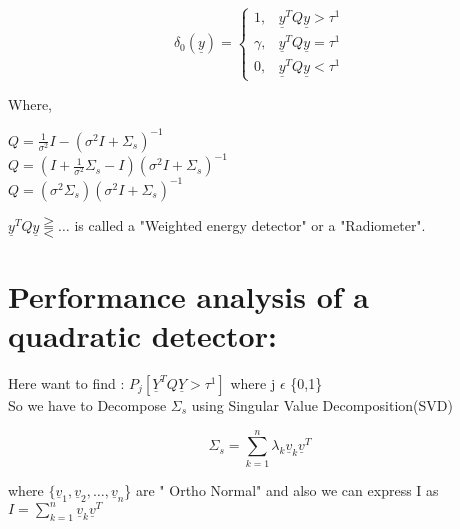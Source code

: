 \documentclass[12pt]{report}
\begin{document}
	\begin{equation}
	\delta_0 (\underline{y}) =  
	\begin{cases}
	1, &\underline{y}^TQ\underline{y}>\tau^1   \\
	\gamma,&\underline{y}^TQ\underline{y}=\tau^1 \\
	0,&\underline{y}^TQ\underline{y}<\tau^1
    \end{cases} 
	\end{equation}
	
	Where,\linebreak
	\begin{center}
	 $ Q=\frac{1}{\sigma^2}I - (\sigma^2I+\Sigma_s)^{-1}$\\
	 
	
     $Q=(I+\frac{1}{\sigma^2}\Sigma_s-I) (\sigma^2I+\Sigma_s)^{-1}$\\
     
	
 $Q=(\sigma^2\Sigma_s) (\sigma^2I+\Sigma_s)^{-1}$\\
	\end{center}
 $\underline{y}^TQ\underline{y}\gtreqqless \ldots$ is called a "Weighted energy detector" or a "Radiometer".\\
	
	\section { Performance analysis of a quadratic detector:}
	
	\noindent  Here want to find :        $ P_j[ \underline{Y}^TQ\underline{Y}>\tau^1]$ where j  $\epsilon$ \{0,1\} \\
	
	\noindent So we have to Decompose $ \Sigma_s$ using Singular Value Decomposition(SVD) \\
	
	\begin{center}
 $$\Sigma_s=\sum_{k=1}^{n} \lambda_k\underline{v}_k\underline{v}^T $$
	\end{center}
	\noindent where $\{\underline{v}_1,\underline{v}_2,\ldots,\underline{v}_n$\} are " Ortho Normal" and also we can express I as  $I= \sum_{k=1}^{n}\underline{v}_k\underline{v}^T$\\
	
\end{document}
